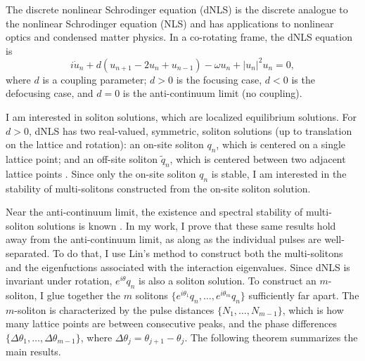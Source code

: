 \documentclass[12pt,reqno]{amsart}
\theoremstyle{definition}
\theoremstyle{remark}
\begin{document}
The discrete nonlinear Schrodinger equation (dNLS) is the discrete analogue to the nonlinear Schrodinger equation (NLS) and has applications to nonlinear optics and condensed matter physics. In a co-rotating frame, the dNLS equation is
\begin{equation}\label{dNLS}
i\dot{u}_n + d(u_{n+1} - 2 u_n + u_{n-1}) - \omega u_n + |u_n|^2 u_n = 0,
\end{equation}
where $d$ is a coupling parameter; $d > 0$ is the focusing case, $d < 0$ is the defocusing case, and $d = 0$ is the anti-continuum limit (no coupling). 

I am interested in soliton solutions, which are localized equilibrium solutions. For $d > 0$, dNLS has two real-valued, symmetric, soliton solutions (up to translation on the lattice and rotation): an on-site soliton $q_n$, which is centered on a single lattice point; and an off-site soliton $\tilde{q}_n$, which is centered between two adjacent lattice points \cite{Kevrekidis2009}. Since only the on-site soliton $q_n$ is stable, I am interested in the stability of multi-solitons constructed from the on-site soliton solution.

Near the anti-continuum limit, the existence and spectral stability of multi-soliton solutions is known \cite{Pelinovsky2005}. In my work, I prove that these same results hold away from the anti-continuum limit, as along as the individual pulses are well-separated. To do that, I use Lin's method to construct both the multi-solitons and the eigenfuctions associated with the interaction eigenvalues. Since dNLS is invariant under rotation, $e^{i \theta} q_n$ is also a soliton solution. To construct an $m$-soliton, I glue together the $m$ solitons $\{ e^{i \theta_1} q_n, \dots, e^{i \theta_m} q_n \}$ sufficiently far apart. The $m$-soliton is characterized by the pulse distances $\{N_1, \dots, N_{m-1} \}$, which is how many lattice points are between consecutive peaks, and the phase differences $\{ \Delta \theta_1, \dots, \Delta \theta_{m-1}\}$, where $\Delta\theta_j = \theta_{j+1} - \theta_j$. The following theorem summarizes the main results.
\end{document}
